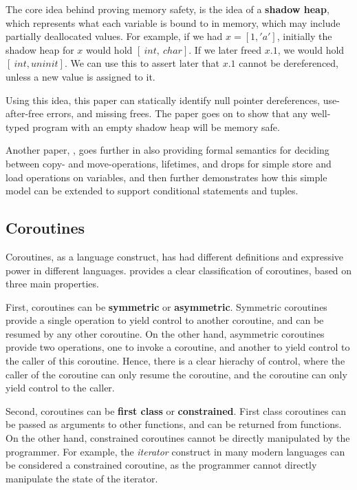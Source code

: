 \documentclass[review,twocolumn,preprint]{sigplanconf}
\begin{document}
The core idea behind proving memory safety, is the idea of a \textbf{shadow heap}, which represents what each variable is bound to in memory, which may include partially deallocated values. For example, if we had $x = [1, 'a']$, initially the shadow heap for $x$ would hold $[~int, ~char]$. If we later freed $x.1$, we would hold $[~int, uninit]$. We can use this to assert later that $x.1$ cannot be dereferenced, unless a new value is assigned to it.

Using this idea, this paper can statically identify null pointer dereferences, use-after-free errors, and missing frees. The paper goes on to show that any well-typed program with an empty shadow heap will be memory safe.

Another paper, \citet{pearce2021}, goes further in also providing formal semantics for deciding between copy- and move-operations, lifetimes, and drops for simple store and load operations on variables, and then further demonstrates how this simple model can be extended to support conditional statements and tuples.


\subsection{Coroutines}

Coroutines, as a language construct, has had different definitions and expressive power in different languages. \citet{moura2009} provides a clear classification of coroutines, based on three main properties.

First, coroutines can be \textbf{symmetric} or \textbf{asymmetric}. Symmetric coroutines provide a single operation to yield control to another coroutine, and can be resumed by any other coroutine. On the other hand, asymmetric coroutines provide two operations, one to invoke a coroutine, and another to yield control to the caller of this coroutine. Hence, there is a clear hierachy of control, where the caller of the coroutine can only resume the coroutine, and the coroutine can only yield control to the caller.

Second, coroutines can be \textbf{first class} or \textbf{constrained}. First class coroutines can be passed as arguments to other functions, and can be returned from functions. On the other hand, constrained coroutines cannot be directly manipulated by the programmer. For example, the \textit{iterator} construct in many modern languages can be considered a constrained coroutine, as the programmer cannot directly manipulate the state of the iterator.
\end{document}
